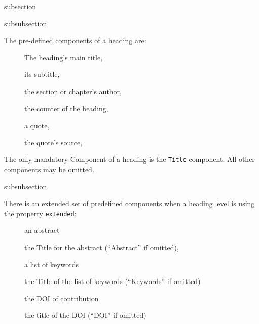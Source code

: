 \begin{Heading}[label=sec:hdg:comp]{subsection}
\end{Heading}

\begin{Heading}[label=sec:hdg:comp:predef]{subsubsection}
\end{Heading}

The pre-defined components of a heading are:
\begin{description}
\item[\string\Title] The heading's main title,
\item[\string\Subtitle] its subtitle,
\item[\string\Author] the section or chapter's author,
\item[\string\Number] the counter of the heading,
\item[\string\Quote] a quote,
\item[\string\QuoteSource] the quote's source,
\end{description}
The only mandatory Component of a heading is the \lstinline{Title}
component. All other components may be omitted.

\begin{Heading}{subsubsection}
\end{Heading}

There is an extended set of predefined components when a heading level is using the property \lstinline{extended}:
\begin{description}
\item[\string\Abstract] an abstract
\item[\string\AbstractLabel] the Title for the abstract (``Abstract'' if omitted),
\item[\string\Keywords] a list of keywords 
\item[\string\KeywordsLabel] the Title of the list of keywords (``Keywords'' if omitted)
\item[\string\DOI] the DOI of contribution
\item[\string\DOILabel] the title of the DOI (``DOI'' if omitted)
\end{description}


